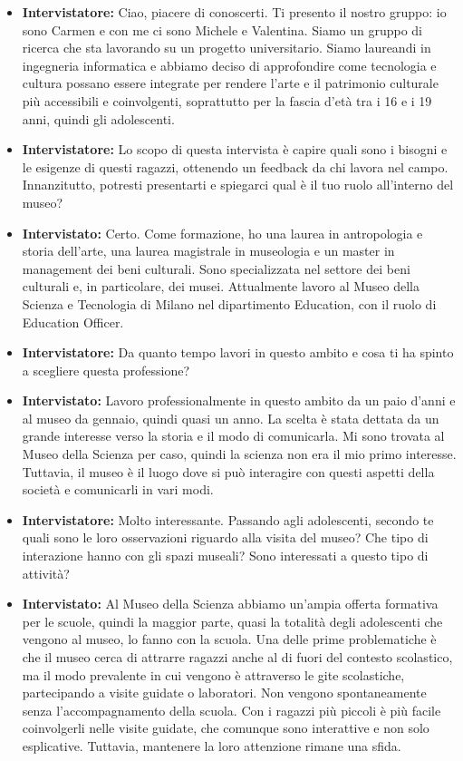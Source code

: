 \documentclass{article}
\begin{document}
\begin{itemize}
    \item \textbf{Intervistatore:} Ciao, piacere di conoscerti. Ti presento il nostro gruppo: io sono Carmen e con me ci sono Michele e Valentina. Siamo un gruppo di ricerca che sta lavorando su un progetto universitario. Siamo laureandi in ingegneria informatica e abbiamo deciso di approfondire come tecnologia e cultura possano essere integrate per rendere l'arte e il patrimonio culturale più accessibili e coinvolgenti, soprattutto per la fascia d'età tra i 16 e i 19 anni, quindi gli adolescenti.
    
    \item \textbf{Intervistatore:} Lo scopo di questa intervista è capire quali sono i bisogni e le esigenze di questi ragazzi, ottenendo un feedback da chi lavora nel campo. Innanzitutto, potresti presentarti e spiegarci qual è il tuo ruolo all'interno del museo?
    
    \item \textbf{Intervistato:} Certo. Come formazione, ho una laurea in antropologia e storia dell'arte, una laurea magistrale in museologia e un master in management dei beni culturali. Sono specializzata nel settore dei beni culturali e, in particolare, dei musei. Attualmente lavoro al Museo della Scienza e Tecnologia di Milano nel dipartimento Education, con il ruolo di Education Officer.
    
    \item \textbf{Intervistatore:} Da quanto tempo lavori in questo ambito e cosa ti ha spinto a scegliere questa professione?
    
    \item \textbf{Intervistato:} Lavoro professionalmente in questo ambito da un paio d'anni e al museo da gennaio, quindi quasi un anno. La scelta è stata dettata da un grande interesse verso la storia e il modo di comunicarla. Mi sono trovata al Museo della Scienza per caso, quindi la scienza non era il mio primo interesse. Tuttavia, il museo è il luogo dove si può interagire con questi aspetti della società e comunicarli in vari modi.
    
    \item \textbf{Intervistatore:} Molto interessante. Passando agli adolescenti, secondo te quali sono le loro osservazioni riguardo alla visita del museo? Che tipo di interazione hanno con gli spazi museali? Sono interessati a questo tipo di attività?
    
    \item \textbf{Intervistato:} Al Museo della Scienza abbiamo un'ampia offerta formativa per le scuole, quindi la maggior parte, quasi la totalità degli adolescenti che vengono al museo, lo fanno con la scuola. Una delle prime problematiche è che il museo cerca di attrarre ragazzi anche al di fuori del contesto scolastico, ma il modo prevalente in cui vengono è attraverso le gite scolastiche, partecipando a visite guidate o laboratori. Non vengono spontaneamente senza l'accompagnamento della scuola. Con i ragazzi più piccoli è più facile coinvolgerli nelle visite guidate, che comunque sono interattive e non solo esplicative. Tuttavia, mantenere la loro attenzione rimane una sfida.
    

\end{itemize}
\end{document}
